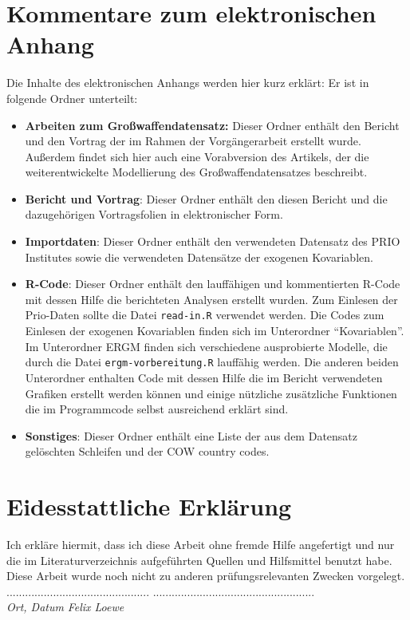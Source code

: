\documentclass[a4paper,ngerman,oneside,titlepage,bibliography=totoc,11pt]{scrreprt}
\begin{document}
\chapter*{Kommentare zum elektronischen Anhang}
Die Inhalte des elektronischen Anhangs werden hier kurz erklärt: Er ist in folgende Ordner unterteilt:
\begin{itemize}
	\item \textbf{Arbeiten zum Großwaffendatensatz:} Dieser Ordner enthält den Bericht und den Vortrag der im Rahmen der Vorgängerarbeit erstellt wurde. Außerdem findet sich hier auch eine Vorabversion des Artikels, der die weiterentwickelte Modellierung des Großwaffendatensatzes beschreibt.
	\item \textbf{Bericht und Vortrag}: Dieser Ordner enthält den diesen Bericht und die dazugehörigen Vortragsfolien in elektronischer Form.
	\item \textbf{Importdaten}: Dieser Ordner enthält den verwendeten Datensatz des PRIO Institutes sowie die verwendeten Datensätze der exogenen Kovariablen.
	\item \textbf{R-Code}: Dieser Ordner enthält den lauffähigen und kommentierten R-Code mit dessen Hilfe die berichteten Analysen erstellt wurden. Zum Einlesen der Prio-Daten sollte die Datei \texttt{read-in.R} verwendet werden. Die Codes zum Einlesen der exogenen Kovariablen finden sich im Unterordner "`Kovariablen"'. Im Unterordner ERGM finden sich verschiedene ausprobierte Modelle, die durch die Datei \texttt{ergm-vorbereitung.R} lauffähig werden. Die anderen beiden Unterordner enthalten Code mit dessen Hilfe die im Bericht verwendeten Grafiken erstellt werden können und einige nützliche zusätzliche Funktionen die im Programmcode selbst ausreichend erklärt sind.
	\item \textbf{Sonstiges}: Dieser Ordner enthält eine Liste der aus dem Datensatz gelöschten Schleifen und der COW country codes.
\end{itemize} 


\chapter*{Eidesstattliche Erklärung}

Ich erkläre hiermit, dass ich diese Arbeit ohne fremde Hilfe angefertigt und nur die im Literaturverzeichnis aufgeführten Quellen und Hilfsmittel benutzt habe. Diese Arbeit wurde noch nicht zu anderen prüfungsrelevanten Zwecken vorgelegt.\\[1.5cm]

\noindent ..............................................
\qquad\qquad\qquad\qquad\qquad
....................................................\\[0.5mm]
\textit{Ort, Datum}
\qquad\qquad\qquad\qquad\qquad\qquad\qquad\qquad\qquad
\textit{Felix Loewe}
\end{document}
